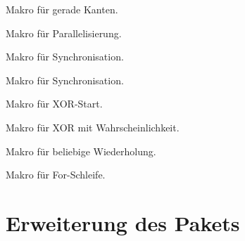 \documentclass[11pt]{article}
\begin{document}
 Makro für gerade Kanten.\bigskip

\DescribeMacro{\memoparaconn}\medskip

Makro für Parallelisierung.\bigskip

\DescribeMacro{\memosync} Makro für Synchronisation.\bigskip

\DescribeMacro{\memoconnsync} Makro für Synchronisation.\bigskip

\DescribeMacro{\memoconnxor} Makro für XOR-Start.\bigskip

\DescribeMacro{\memoconnxorprobability} Makro für XOR mit Wahrscheinlichkeit.\bigskip

\DescribeMacro{\memoiterationuntil} Makro für beliebige Wiederholung.\bigskip

\DescribeMacro{\memoiterationloop} Makro für For-Schleife.\bigskip

\section{Erweiterung des Pakets}
\label{sec:Erweiterung}
\end{document}
